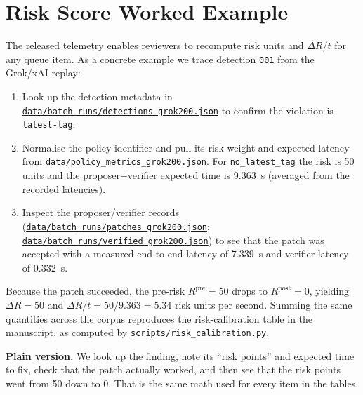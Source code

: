 \documentclass[10pt]{article}
\begin{document}
\section{Risk Score Worked Example}
\label{app:risk_example}
The released telemetry enables reviewers to recompute risk units and $\Delta R/t$ for any queue item. As a concrete example we trace detection \texttt{001} from the Grok/xAI replay:
\begin{enumerate}
    \item Look up the detection metadata in \href{https://github.com/bmendonca3/k8s-auto-fix/blob/tcc-2025-12-0666-packet-2026-05-31/data/batch_runs/detections_grok200.json}{\texttt{data/batch\_runs/detections\_grok200.json}} to confirm the violation is \texttt{latest-tag}.
    \item Normalise the policy identifier and pull its risk weight and expected latency from \href{https://github.com/bmendonca3/k8s-auto-fix/blob/tcc-2025-12-0666-packet-2026-05-31/data/policy_metrics_grok200.json}{\texttt{data/policy\_metrics\_grok200.json}}. For \texttt{no\_latest\_tag} the risk is 50 units and the proposer+verifier expected time is 9.363~s (averaged from the recorded latencies).
    \item Inspect the proposer/verifier records (\href{https://github.com/bmendonca3/k8s-auto-fix/blob/tcc-2025-12-0666-packet-2026-05-31/data/batch_runs/patches_grok200.json}{\texttt{data/batch\_runs/patches\_grok200.json}}; \href{https://github.com/bmendonca3/k8s-auto-fix/blob/tcc-2025-12-0666-packet-2026-05-31/data/batch_runs/verified_grok200.json}{\texttt{data/batch\_runs/verified\_grok200.json}}) to see that the patch was accepted with a measured end-to-end latency of 7.339~s and verifier latency of 0.332~s.
\end{enumerate}
Because the patch succeeded, the pre-risk $R^{\text{pre}}=50$ drops to $R^{\text{post}} = 0$, yielding $\Delta R = 50$ and $\Delta R/t = 50 / 9.363 = 5.34$ risk units per second. Summing the same quantities across the corpus reproduces the risk-calibration table in the manuscript, as computed by \href{https://github.com/bmendonca3/k8s-auto-fix/blob/tcc-2025-12-0666-packet-2026-05-31/scripts/risk_calibration.py}{\texttt{scripts/risk\_calibration.py}}.

\noindent\textbf{Plain version.} We look up the finding, note its “risk points” and expected time to fix, check that the patch actually worked, and then see that the risk points went from 50 down to 0. That is the same math used for every item in the tables.
\end{document}
